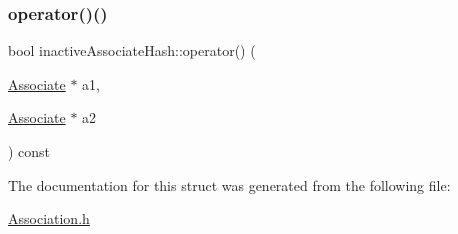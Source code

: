 \subsubsection{\texorpdfstring{operator()()}{operator()()}\hspace{0.1cm}{\footnotesize\ttfamily [2/2]}}
{\footnotesize\ttfamily bool inactive\+Associate\+Hash\+::operator() (\begin{DoxyParamCaption}\item[{\mbox{\hyperlink{classAssociate}{Associate}} $\ast$}]{a1,  }\item[{\mbox{\hyperlink{classAssociate}{Associate}} $\ast$}]{a2 }\end{DoxyParamCaption}) const\hspace{0.3cm}{\ttfamily [inline]}}



The documentation for this struct was generated from the following file\+:\begin{DoxyCompactItemize}
\item 
\mbox{\hyperlink{Association_8h}{Association.\+h}}\end{DoxyCompactItemize}
